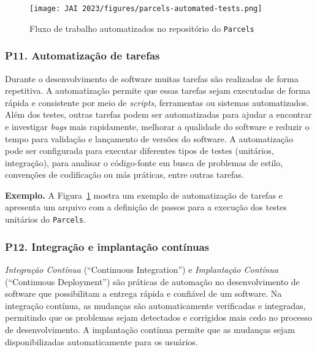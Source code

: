 \begin{figure}[tbp]
    \centering
    \texttt{[image: JAI 2023/figures/parcels-automated-tests.png]}
    \caption{Fluxo de trabalho automatizados no repositório do \RSw \texttt{Parcels}}
    \label{fig:automatizacao:parcels}
\end{figure}

\subsubsection*{P11. Automatização de tarefas} 

Durante o desenvolvimento de software muitas tarefas são realizadas de forma repetitiva. A automatização permite que essas tarefas sejam executadas de forma rápida e consistente por meio de \textit{scripts}, ferramentas ou sistemas automatizados.
Além dos testes, outras tarefas podem ser automatizadas para ajudar a encontrar e investigar \textit{bugs} mais rapidamente, melhorar a qualidade do software e reduzir o tempo para validação e lançamento de versões do software. 
A automatização pode ser configurada para executar diferentes tipos de testes (unitários, integração), para analisar o código-fonte em busca de problemas de estilo, convenções de codificação ou más práticas, entre outras tarefas. 

\noindent \textbf{Exemplo.}
A Figura~\ref{fig:automatizacao:parcels} mostra um exemplo de automatização de tarefas 
e apresenta um arquivo com a definição de passos para a execução dos testes unitários do \RSw \texttt{Parcels}.




\subsubsection*{P12. Integração e implantação contínuas} 

\textit{Integração Contínua} (``Continuous Integration'') e \textit{Implantação Contínua} (``Continuous Deployment'') são práticas de automação no desenvolvimento de software que possibilitam a entrega rápida e confiável de um software. 
Na integração contínua, as mudanças são automaticamente verificadas e integradas, permitindo que os problemas sejam detectados e corrigidos mais cedo no processo de desenvolvimento. A implantação contínua permite que as mudanças sejam disponibilizadas automaticamente para os usuários.

